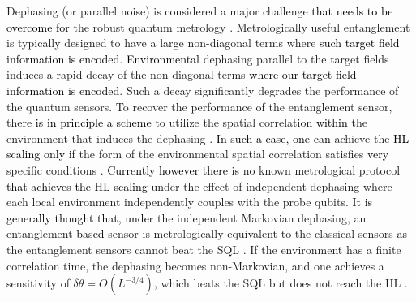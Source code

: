 \documentclass[prl,twocolumn,superscriptaddress]{revtex4}
\begin{document}
Dephasing (or parallel noise) is considered a major challenge
\textcolor{black}{that needs to be overcome for}
the robust quantum metrology \cite{huelga1997improvement,lee2009optimization,escher2011general,nichols2016practical}.
Metrologically useful entanglement is typically designed to have a large
non-diagonal terms
where \textcolor{black}{such target field information is encoded.}
\textcolor{black}{Environmental} dephasing
parallel to the target
fields
induces a rapid decay of the
non-diagonal terms \textcolor{black}{where our target field information is encoded}. Such a decay significantly degrades the performance
of the quantum sensors. 
To recover the performance of the entanglement sensor,
there \textcolor{black}{is in principle a scheme}
to utilize the spatial correlation
\textcolor{black}{within} the environment that induces the dephasing
\cite{jeske2014quantum}.
\textcolor{black}{In such a case, one can}  achieve the 
\textcolor{black}{HL scaling only}
if the
form of the environmental spatial correlation satisfies \textcolor{black}{very} specific conditions
\cite{jeske2014quantum}.
\textcolor{black}{Currently however there} is no known metrological
protocol
\textcolor{black}{that achieves the HL scaling}
under the effect of independent dephasing where each local environment
independently couples with the probe qubits.
\textcolor{black}{It is generally thought that, under}
the independent Markovian dephasing,
an entanglement \textcolor{black}{based} sensor is metrologically equivalent
to the classical sensors
\textcolor{black}{as} the entanglement sensors cannot
beat the SQL \cite{huelga1997improvement,shaji2007qubit,demkowicz2012elusive}.
If the environment has a finite 
correlation time, the dephasing becomes non-Markovian,
and one achieves a sensitivity of $\delta \theta =O
(L^{-3/4})$, which beats the SQL but does not reach the HL
\cite{jones2009magnetic,matsuzaki2011magnetic,chin2012quantum,macieszczak2015zeno,tanaka2015proposed}. 
\end{document}
